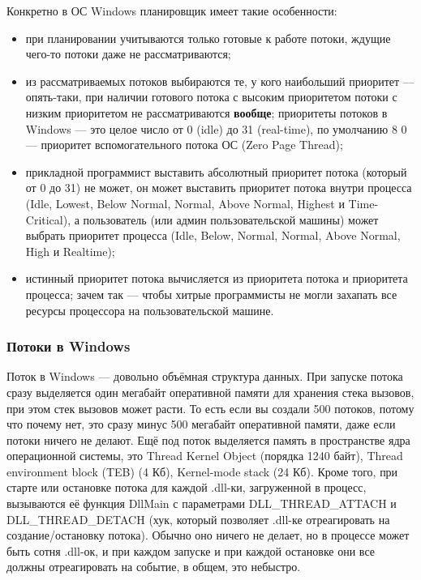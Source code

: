 \documentclass[a5paper]{article}
\begin{document}
Конкретно в ОС Windows планировщик имеет такие особенности:
\begin{itemize}
    \item при планировании учитываются только готовые к работе потоки, ждущие чего-то потоки даже не рассматриваются;
    \item из рассматриваемых потоков выбираются те, у кого наибольший приоритет --- опять-таки, при наличии готового потока с высоким приоритетом потоки с низким приоритетом не рассматриваются \textbf{вообще}; приоритеты потоков в Windows --- это целое число от 0 (idle) до 31 (real-time), по умолчанию 8 0 --- приоритет вспомогательного потока ОС (Zero Page Thread);
    \item прикладной программист выставить абсолютный приоритет потока (который от 0 до 31) не может, он может выставить приоритет потока внутри процесса (Idle, Lowest, Below Normal, Normal, Above Normal, Highest и Time-Critical), а пользователь (или админ пользовательской машины) может выбрать приоритет процесса (Idle, Below, Normal, Normal, Above Normal, High и Realtime);
    \item истинный приоритет потока вычисляется из приоритета потока и приоритета процесса; зачем так --- чтобы хитрые программисты не могли захапать все ресурсы процессора на пользовательской машине.
\end{itemize}

\subsubsection{Потоки в Windows}

Поток в Windows --- довольно объёмная структура данных. При запуске потока сразу выделяется один мегабайт оперативной памяти для хранения стека вызовов, при этом стек вызовов может расти. То есть если вы создали 500 потоков, потому что почему нет, это сразу минус 500 мегабайт оперативной памяти, даже если потоки ничего не делают. Ещё под поток выделяется память в пространстве ядра операционной системы, это Thread Kernel Object (порядка 1240 байт), Thread environment block (TEB) (4 Кб), Kernel-mode stack (24 Кб). Кроме того, при старте или остановке потока для каждой .dll-ки, загруженной в процесс, вызываются её функция DllMain с параметрами DLL\_THREAD\_ATTACH и DLL\_THREAD\_DETACH (хук, который позволяет .dll-ке отреагировать на создание/остановку потока). Обычно оно ничего не делает, но в процессе может быть сотня .dll-ок, и при каждом запуске и при каждой остановке они все должны отреагировать на событие, в общем, это небыстро.
\end{document}
